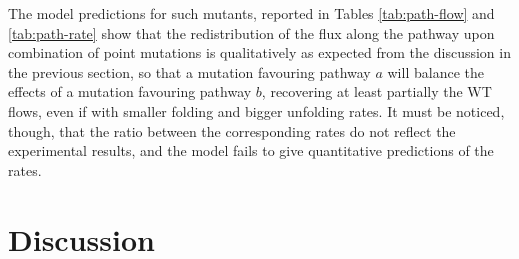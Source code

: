 The model predictions for such mutants, reported in Tables \ref{tab:path-flow} and \ref{tab:path-rate}
 show that the redistribution of the flux along the pathway upon combination of
point mutations is qualitatively as expected from the discussion in the previous
section, so that a mutation favouring  pathway $a$ will balance the effects of a
mutation favouring pathway $b$, recovering at least partially the WT flows, even
if with smaller folding and bigger unfolding rates.
It must be noticed, though, that the ratio between the corresponding rates do
not reflect the experimental results, and the model fails to give quantitative
predictions of the rates.


\section{Discussion}



